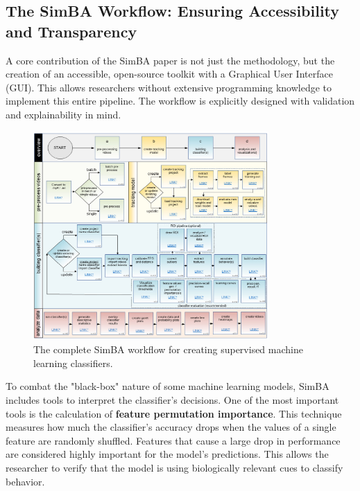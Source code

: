 \subsection{The SimBA Workflow: Ensuring Accessibility and Transparency}
A core contribution of the SimBA paper is not just the methodology, but the creation of an accessible, open-source toolkit with a Graphical User Interface (GUI). This allows researchers without extensive programming knowledge to implement this entire pipeline. The workflow is explicitly designed with validation and explainability in mind.

\begin{figure}[H]
    \centering
    \includegraphics[width=0.8\textwidth]{archivos/figuras/flowchart_simba.jpg} 
    \caption{The complete SimBA workflow for creating supervised machine learning classifiers.}
    \label{fig:simba_workflow}
\end{figure}

To combat the "black-box" nature of some machine learning models, SimBA includes tools to interpret the classifier's decisions. One of the most important tools is the calculation of \textbf{feature permutation importance}. This technique measures how much the classifier's accuracy drops when the values of a single feature are randomly shuffled. Features that cause a large drop in performance are considered highly important for the model's predictions. This allows the researcher to verify that the model is using biologically relevant cues to classify behavior.

